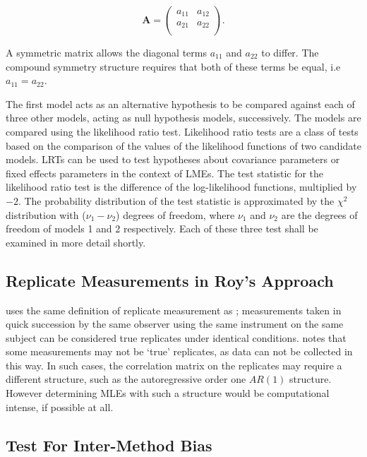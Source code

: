 \documentclass[12pt, a4paper]{report}
\theoremstyle{plain}
\theoremstyle{definition}
\theoremstyle{remark}
\begin{document}
		\[
		\boldsymbol{A} = \left( \begin{array}{cc}
		a_{11} & a_{12}  \\
		a_{21} & a_{22}  \\
		\end{array}\right).
		\]
		
A symmetric matrix allows the diagonal terms $a_{11}$ and $a_{22}$ to differ. The compound symmetry structure requires that both of these terms be equal, i.e $a_{11} = a_{22}$.
		
The first model acts as an alternative hypothesis to be compared against each of three other models, acting as null hypothesis models, successively. The models are compared using the likelihood ratio test. Likelihood ratio tests are a class of tests based on the comparison of the values of the likelihood functions of two candidate models. LRTs can be used to test hypotheses about covariance parameters or fixed effects parameters in the context of LMEs. The test statistic for the likelihood ratio test is the difference of the log-likelihood functions, multiplied by $-2$.
The probability distribution of the test statistic is approximated by the $\chi^2$ distribution with ($\nu_{1} - \nu_{2}$) degrees of freedom, where $\nu_{1}$ and $\nu_{2}$ are the degrees of freedom of models 1 and 2 respectively. Each of these three test shall be examined in more detail shortly.
		

\subsection{Replicate Measurements in Roy's Approach}
	
	
\citet{ARoy2009} uses the same definition of replicate measurement as \citet{BA99}; 	measurements taken in quick succession by the same observer using the same instrument on the same subject can be considered true replicates under identical conditions. \citet{ARoy2009} notes that some measurements may not be `true' replicates, as data can not be collected in this way. In such cases, the correlation matrix on the replicates may require a different structure, such as the autoregressive order one $AR(1)$ structure. However determining MLEs with such a structure would be computational intense, if possible at all.
	
	
\subsection{Test For Inter-Method Bias}
	
\end{document}
